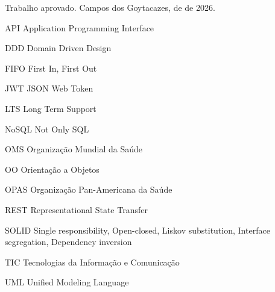 \documentclass[
  12pt,
  oneside,              %
  openany,
  a4paper,
  english,
  brazilian
]{abntex2}
\begin{document}
\pretextual

\imprimircapa

\imprimirfolhaderosto*

\begin{folhadeaprovacao}
\begin{center}
  {\ABNTEXchapterfont\large\imprimirautor}
  \vspace*{\fill}
  \begin{center}
    \ABNTEXchapterfont\bfseries\Large\imprimirtitulo
  \end{center}
  \vspace*{\fill}
  \hspace{.45\textwidth}
  \begin{minipage}{.5\textwidth}
    \imprimirpreambulo
  \end{minipage}%
  \vspace*{\fill}
  {\large
  Trabalho aprovado. Campos dos Goytacazes, \underline{\hspace{2cm}} de \underline{\hspace{3cm}} de 2026.}
  \vspace*{2cm}
  \vspace*{1cm}
  \vspace*{1cm}
  \vspace*{\fill}
\end{center}
\end{folhadeaprovacao}

\begin{siglas}
  \item[API] Application Programming Interface
  \item[DDD] Domain Driven Design
  \item[FIFO] First In, First Out
  \item[JWT] JSON Web Token
  \item[LTS] Long Term Support
  \item[NoSQL] Not Only SQL
  \item[OMS] Organização Mundial da Saúde
  \item[OO] Orientação a Objetos
  \item[OPAS] Organização Pan-Americana da Saúde
  \item[REST] Representational State Transfer
  \item[SOLID] Single responsibility, Open-closed, Liskov substitution, Interface segregation, Dependency inversion
  \item[TIC] Tecnologias da Informação e Comunicação
  \item[UML] Unified Modeling Language
\end{siglas}
\end{document}
